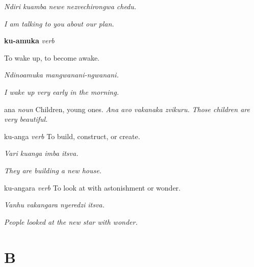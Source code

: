 \documentclass[10pt,twoside]{book}
\newcommand{\verbheadword}[2]{%
    \textbf{\large\color{prefixcolor}#1\color{headwordcolor}#2}%
}
\newcommand{\verbpos}{\textit{\color{verbcolor}verb}}
\newcommand{\partofpeech}[1]{%
    \textit{\color{partofpeechcolor}#1}%
}
\newcommand{\example}[2]{%
    \textit{\color{examplecolor}#1} \textit{#2}%
}
\begin{document}
\begin{multicols}{2}
\begin{samepage}
{\color{examplecolor}\small\textit{Ndiri kuamba newe nezvechirongwa chedu.}}

{\color{englishexamplecolor}\small\textit{I am talking to you about our plan.}}
\end{samepage}

\par\vspace{4pt}

\begin{samepage}
\par\noindent\verbheadword{ku-}{amuka}\space\verbpos

To wake up, to become awake.

{\color{examplecolor}\small\textit{Ndinoamuka mangwanani-ngwanani.}}

{\color{englishexamplecolor}\small\textit{I wake up very early in the morning.}}
\end{samepage}

\par\vspace{4pt}

\begin{dictentry}{ana}
\partofpeech{noun} Children, young ones. \example{Ana avo vakanaka zvikuru.}{Those children are very beautiful.}
\end{dictentry}

\begin{dictentry}{ku-anga}
\partofpeech{verb} To build, construct, or create.

\textit{Vari kuanga imba itsva.}

\textit{They are building a new house.}
\end{dictentry}

\begin{dictentry}{ku-angara}
\partofpeech{verb} To look at with astonishment or wonder.

\textit{Vanhu vakangara nyeredzi itsva.}

\textit{People looked at the new star with wonder.}
\end{dictentry}

\end{multicols}

\chapter*{B}
\label{chap:B}
\end{document}
